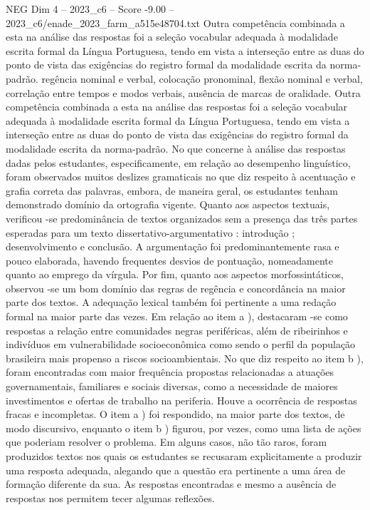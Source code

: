 \begin{textsample}{NEG Dim 4 – 2023\_c6 – Score -9.00 – 2023\_c6/enade\_2023\_farm\_a515e48704.txt}
Outra competência combinada a esta na análise das respostas foi a seleção vocabular adequada à modalidade escrita formal da Língua Portuguesa, tendo em vista a interseção entre as duas do ponto de vista das exigências do registro formal da modalidade escrita da norma-padrão. regência nominal e verbal, colocação pronominal, flexão nominal e verbal, correlação entre tempos e modos verbais, ausência de marcas de oralidade.
Outra competência combinada a esta na análise das respostas foi a seleção vocabular adequada à modalidade escrita formal da Língua Portuguesa, tendo em vista a interseção entre as duas do ponto de vista das exigências do registro formal da modalidade escrita da norma-padrão.
No que concerne à análise das respostas dadas pelos estudantes, especificamente, em relação ao desempenho linguístico, foram observados muitos deslizes gramaticais no que diz respeito à acentuação e grafia correta das palavras, embora, de maneira geral, os estudantes tenham demonstrado domínio da ortografia vigente.
Quanto aos aspectos textuais, verificou -se predominância de textos organizados sem a presença das três partes esperadas para um texto dissertativo-argumentativo : introdução ; desenvolvimento e conclusão.
A argumentação foi predominantemente rasa e pouco elaborada, havendo frequentes desvios de pontuação, nomeadamente quanto ao emprego da vírgula.
Por fim, quanto aos aspectos morfossintáticos, observou -se um bom domínio das regras de regência e concordância na maior parte dos textos.
A adequação lexical também foi pertinente a uma redação formal na maior parte das vezes.
Em relação ao item a ), destacaram -se como respostas a relação entre comunidades negras periféricas, além de ribeirinhos e indivíduos em vulnerabilidade socioeconômica como sendo o perfil da população brasileira mais propenso a riscos socioambientais.
No que diz respeito ao item b ), foram encontradas com maior frequência propostas relacionadas a atuações governamentais, familiares e sociais diversas, como a necessidade de maiores investimentos e ofertas de trabalho na periferia.
Houve a ocorrência de respostas fracas e incompletas.
O item a ) foi respondido, na maior parte dos textos, de modo discursivo, enquanto o item b ) figurou, por vezes, como uma lista de ações que poderiam resolver o problema.
Em alguns casos, não tão raros, foram produzidos textos nos quais os estudantes se recusaram explicitamente a produzir uma resposta adequada, alegando que a questão era pertinente a uma área de formação diferente da sua.
As respostas encontradas e mesmo a ausência de respostas nos permitem tecer algumas reflexões.

\end{textsample}
